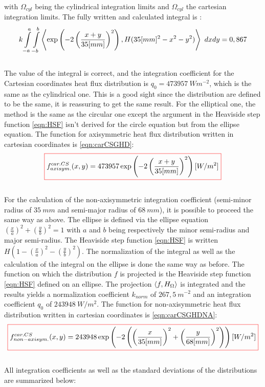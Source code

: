\\
\normalsize{with $\Omega_{cyl}$ being the cylindrical integration limits and $\Omega_{cyl}$ the cartesian integration limits. The fully written and calculated integral is :}
\\
\begin{equation}
    k \int\displaylimits_{-a}^{a} \int\displaylimits_{-b}^{b} \left\langle \exp\left(-2\left(\frac{x+y}{35[mm]}\right)^2 \right) , H(35[mm]^2 - x^2 - y^2 ) \right\rangle \ dxdy = 0,867
\end{equation}
\\
\normalsize{\indent The value of the integral is correct, and the integration coefficient for the Cartesian coordinates heat flux distribution is $q_0=473957 \ Wm^{-2}$,  which is the same as the cylindrical one. This is a good sight since the distribution are defined to be the same, it is reassuring to get the same result. For the elliptical one, the method is the same as the circular one except the argument in the Heaviside step function \eqref{eqn:HSF} isn’t derived for the circle equation but from the ellipse equation. The function for axisymmetric heat flux distribution written in cartesian coordinates is \eqref{eqn:carCSGHD}:}
\\
\begin{equation}
    \color{red}\boxed{\color{black} f_{axisym.}^{car. CS}(x,y) = 473957 \exp\left(-2\left(\frac{x+y}{35[mm]}\right)^2 \right) [W/m^2]}
    \label{eqn:carCSGHD}
\end{equation}
\\
\normalsize{\indent For the calculation of the non-axisymmetric integration coefficient (semi-minor radius of $35 \ mm$ and semi-major radius of $68 \ mm$), it is possible to proceed the same way as above. The ellipse is defined via the ellipse equation $(\frac{x}{a})^2 + (\frac{y}{b})^2 = 1$ with $a$ and $b$ being respectively the minor semi-radius and major semi-radius. The Heaviside step function \eqref{eqn:HSF} is written $H\left(1 - \left(\frac{x}{a}\right)^2 - \left(\frac{y}{b}\right)^2 \right)$. The normalization of the integral as well as the calculation of the integral on the ellipse is done the same way as before. The function on which the distribution $f$ is projected is the Heaviside step function \eqref{eqn:HSF} defined on an ellipse. The projection $\left\langle f , H_{\Omega} \right\rangle$ is integrated and the results yields a normalization coefficient $k_{norm}$ of $267,5 \ m^{-2}$ and an integration coefficient $q_0$ of $243948 \ W/m^{2}$. The function for non-axisymmetric heat flux distribution written in cartesian coordinates is \eqref{eqn:carCSGHDNA}:}
\\
\begin{equation}
    \color{red}\boxed{\color{black} f_{non-axisym.}^{car. CS}(x,y) = 243948 \exp\left(-2\left(\left(\frac{x}{35[mm]}\right)^2 + \left(\frac{y}{68[mm]}\right)^2 \right) \right) [W/m^2]}
    \label{eqn:carCSGHDNA}
\end{equation}
\\
\normalsize{\indent All integration coefficients as well as the standard deviations of the distributions are summarized below:}

